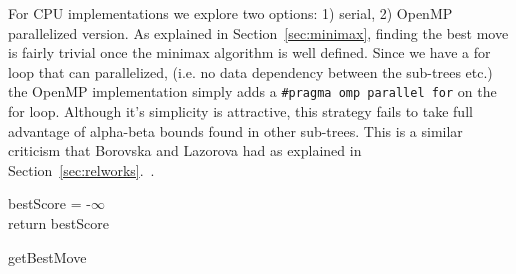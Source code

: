 For CPU implementations we explore two options: 1) serial, 2) OpenMP parallelized version. As explained in Section~\ref{sec:minimax}, finding the best move is fairly trivial once the minimax algorithm is well defined. Since we have a for loop that can parallelized, (i.e. no data dependency between the sub-trees etc.) the OpenMP implementation simply adds a \texttt{#pragma omp parallel for} on the for loop. Although it's simplicity is attractive, this strategy fails to take full advantage of alpha-beta bounds found in other sub-trees. This is a similar criticism that Borovska and Lazorova had as explained in Section~\ref{sec:relworks}.~\cite{borovska}. 

\begin{algorithm}[!htbp]
\SetAlgoLined
{}

bestScore = -$\infty$\\
    return bestScore
\caption{getBestMove}
\label{alg:bestscore}
\end{algorithm}